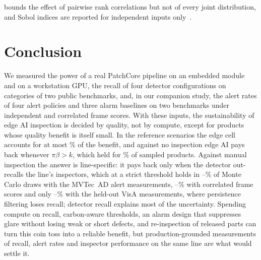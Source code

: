 bounds the effect of pairwise rank correlations but not of every joint distribution, and Sobol indices are reported for independent inputs only~\cite{kim2025global,iooss2019shapley}.

\section{Conclusion}
We measured the power of a real PatchCore pipeline on an embedded module and on a workstation GPU, the recall of four detector configurations on \DetCategories{} categories of two public benchmarks, and, in our companion study, the alert rates of four alert policies and three alarm baselines on two benchmarks under independent and correlated frame scores. With these inputs, the sustainability of edge AI inspection is decided by quality, not by compute, except for products whose quality benefit is itself small. In the reference scenarios the edge cell accounts for at most \EdgeOfBenefitMax\% of the benefit, and against no inspection edge AI pays back whenever $\pi\beta>k$, which held for \PopWinNZero\% of \PopSize{} sampled products. Against manual inspection the answer is line-specific: it pays back only when the detector out-recalls the line's inspectors, which at a strict threshold holds in \McProbLMin--\McProbLMax\% of Monte Carlo draws with the MVTec~AD alert measurements, \CorrMcProbLMin--\CorrMcProbLMax\% with correlated frame scores and only \VisaMcProbLMin--\VisaMcProbLMax\% with the held-out VisA measurements, where persistence filtering loses recall; detector recall explains most of the uncertainty. Spending compute on recall, carbon-aware thresholds, an alarm design that suppresses glare without losing weak or short defects, and re-inspection of released parts can turn this coin toss into a reliable benefit, but production-grounded measurements of recall, alert rates and inspector performance on the same line are what would settle it.
